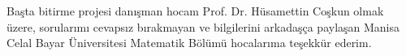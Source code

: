 Başta bitirme projesi danışman hocam Prof. Dr. Hüsamettin Coşkun olmak üzere, sorularımı cevapsız bırakmayan ve bilgilerini arkadaşça paylaşan Manisa Celal Bayar Üniversitesi Matematik Bölümü hocalarıma teşekkür ederim.